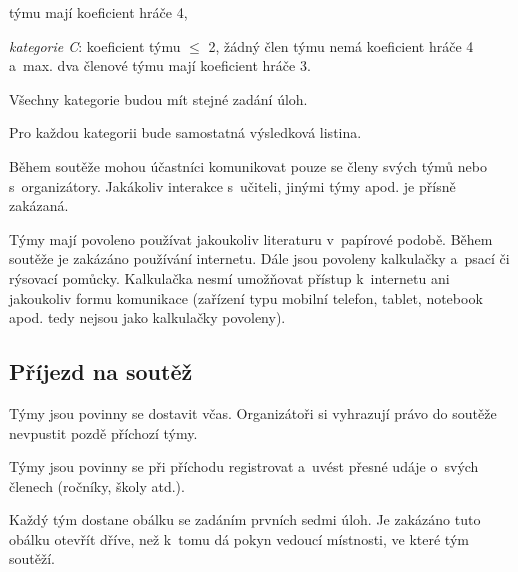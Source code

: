 \documentclass[fykos,\classoptions]{fksgeneric}
\begin{document}
\begin{compactitem}
\begin{compactitem}
		týmu mají koeficient hráče 4,
		\item \emph{kategorie C}: koeficient týmu $\leq$ 2,
		žádný člen týmu nemá koeficient hráče 4 a~max. dva členové týmu mají
		koeficient hráče 3.
	\end{compactitem}
	\item Všechny kategorie budou mít stejné zadání úloh.
	\item Pro každou kategorii bude samostatná výsledková listina.
	\item Během soutěže mohou účastníci komunikovat pouze se členy svých týmů nebo
	s~organizátory. Jakákoliv interakce s~učiteli, jinými týmy apod. je přísně
	zakázaná.
	\item Týmy mají povoleno používat jakoukoliv literaturu v~papírové podobě.
	Během soutěže je zakázáno používání internetu. Dále jsou povoleny kalkulačky
	a~psací či rýsovací pomůcky. Kalkulačka nesmí umožňovat přístup k~internetu ani
	jakoukoliv formu komunikace (zařízení typu mobilní telefon, tablet, notebook
	apod. tedy nejsou jako kalkulačky povoleny).
\end{compactitem}

\subsection*{Příjezd na soutěž}
\begin{compactitem}
	\item Týmy jsou povinny se dostavit včas. Organizátoři si vyhrazují právo do
	soutěže nevpustit pozdě příchozí týmy.
	\item Týmy jsou povinny se při příchodu registrovat a~uvést přesné udáje
	o~svých členech (ročníky, školy atd.).
	\item Každý tým dostane obálku se zadáním prvních sedmi úloh. Je zakázáno tuto
	obálku otevřít dříve, než k~tomu dá pokyn vedoucí místnosti, ve které tým
	soutěží.
\end{compactitem}

\clearpage
\end{document}
